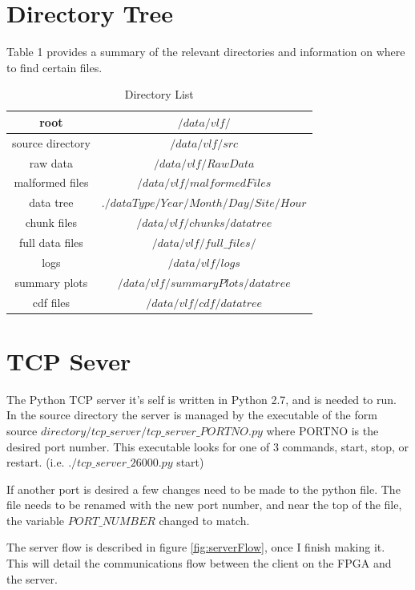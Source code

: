 \documentclass{article}
\begin{document}
\section{Directory Tree}

Table 1 provides a summary of the relevant directories and information on where to find certain files.

\begin{table}[H]
\begin{tabular}{|c|c|} 
\hline
root & $/data/vlf/$ \\ \hline 
source directory & $/data/vlf/src$ \\ \hline
raw data & $/data/vlf/RawData$ \\ \hline
malformed files & $/data/vlf/malformedFiles$ \\ \hline
data tree & $./dataType/Year/Month/Day/Site/Hour$ \\ \hline
chunk files & $/data/vlf/chunks/data tree$ \\ \hline
full data files & $/data/vlf/full\_ files/$ \\ \hline
logs & $/data/vlf/logs$ \\ \hline
summary plots & $/data/vlf/summaryPlots/data tree$ \\ \hline
cdf files & $/data/vlf/cdf/data tree$ \\ \hline
\end{tabular}
\label{table:directories}
\caption{Directory List}
\end{table}


\section{TCP Sever}
The Python TCP server it's self is written in Python 2.7, and is needed to run. In the source directory the server is managed by the executable of the form source $directory/tcp\_ server/tcp\_ server\_ PORTNO.py$ where PORTNO is the desired port number. This executable looks for one of 3 commands, start, stop, or restart. (i.e. $./tcp\_ server\_ 26000.py$ start)

If another port is desired a few changes need to be made to the python file. The file needs to be renamed with the new port number, and near the top of the file, the variable $PORT\_ NUMBER$ changed to match.

The server flow is described in figure \ref{fig:serverFlow}, once I finish making it. This will detail the communications flow between the client on the FPGA and the server. 
\end{document}
